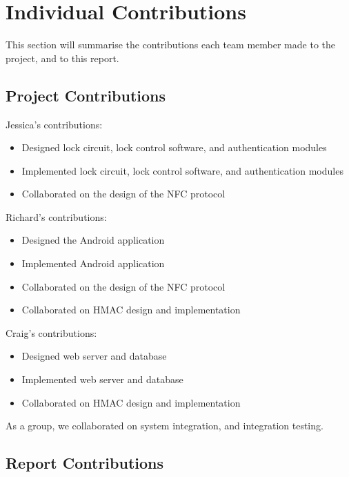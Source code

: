 \documentclass[12pt]{report}
\let\Oldsection\section
\renewcommand{\section}{\FloatBarrier\Oldsection}
\let\Oldsubsection\subsection
\renewcommand{\subsection}{\FloatBarrier\Oldsubsection}
\begin{document}
\section{Individual Contributions} \label{individual-contributions}

This section will summarise the contributions each team member made to the project, and to this report.


\subsection{Project Contributions} \label{project-contributions}

Jessica's contributions:
\begin{itemize}
\item Designed lock circuit, lock control software, and authentication modules
\item Implemented lock circuit, lock control software, and authentication modules
\item Collaborated on the design of the NFC protocol
\end{itemize}

Richard's contributions:
\begin{itemize}
\item Designed the Android application
\item Implemented Android application
\item Collaborated on the design of the NFC protocol
\item Collaborated on HMAC design and implementation
\end{itemize}

Craig's contributions:
\begin{itemize}
\item Designed web server and database
\item Implemented web server and database
\item Collaborated on HMAC design and implementation
\end{itemize}

As a group, we collaborated on system integration, and integration testing.


\subsection{Report Contributions} \label{report-contributions}
\end{document}
